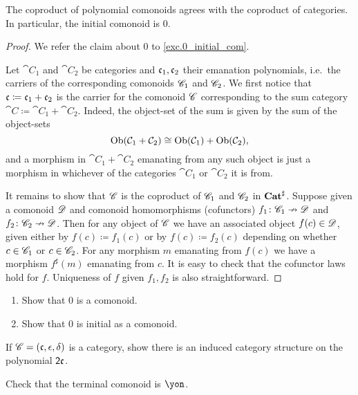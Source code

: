 \documentclass[Book-Poly]{subfiles}
\begin{document}
\begin{proposition}
The coproduct of polynomial comonoids agrees with the coproduct of categories. In particular, the initial comonoid is $0$.
\end{proposition}
\begin{proof}
We refer the claim about $0$ to \cref{exc.0_initial_com}.

Let $\cat{C}_1$ and $\cat{C}_2$ be categories and $\mathfrak{c}_1,\mathfrak{c}_2$ their emanation polynomials, i.e.\ the carriers of the corresponding comonoids $\mathscr{C}_1$ and $\mathscr{C}_2$. We first notice that $\mathfrak{c}\coloneqq\mathfrak{c}_1+\mathfrak{c}_2$ is the carrier for the comonoid $\mathscr{C}$ corresponding to the sum category $\cat{C}\coloneqq\cat{C}_1+\cat{C}_2$. Indeed, the object-set of the sum is given by the sum of the object-sets
\[
	\operatorname{Ob}(\mathcal{C}_1+\mathcal{C}_2)
  \cong
  \operatorname{Ob}(\mathcal{C}_1)+\operatorname{Ob}(\mathcal{C}_2),
\]
and a morphism in $\cat{C}_1+\cat{C}_2$ emanating from any such object is just a morphism in whichever of the categories $\cat{C_1}$ or $\cat{C}_2$ it is from. 

It remains to show that $\mathscr{C}$ is the coproduct of $\mathscr{C}_1$ and $\mathscr{C}_2$ in $\mathbf{Cat}^\sharp$. Suppose given a comonoid $\mathscr{D}$ and comonoid homomorphisms (cofunctors) $f_1\colon\mathscr{C}_1\nrightarrow\mathscr{D}$ and $f_2\colon\mathscr{C}_2\nrightarrow\mathscr{D}$. Then for any object of $\mathscr{C}$ we have an associated object $f(c)\in\mathscr{D}$, given either by $f(c)\coloneqq f_1(c)$ or by $f(c)\coloneqq f_2(c)$ depending on whether $c\in\mathscr{C}_1$ or $c\in\mathscr{C}_2$. For any morphism $m$ emanating from $f(c)$ we have a morphism $f^\sharp(m)$ emanating from $c$. It is easy to check that the cofunctor laws hold for $f$. Uniqueness of $f$ given $f_1,f_2$ is also straightforward.
\end{proof}

\begin{exercise}\label{exc.0_initial_com}
\begin{enumerate}
	\item Show that $0$ is a comonoid.
	\item Show that $0$ is initial as a comonoid.
\qedhere
\end{enumerate}
\end{exercise}

\begin{exercise}
If $\mathscr{C}=(\mathfrak{c},\epsilon,\delta)$ is a category, show there is an induced category structure on the polynomial $\textsf{2}\mathfrak{c}$.
\end{exercise}

\begin{exercise}
Check that the terminal comonoid is $\yon$.
\end{exercise}
\end{document}
